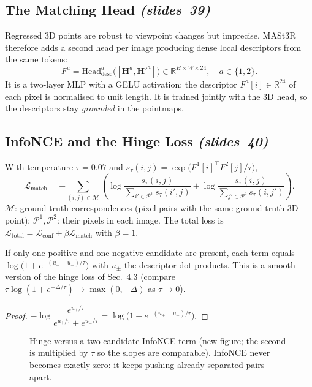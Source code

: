 \documentclass[11pt,a4paper]{article}
\newcommand{\slr}[1]{\texorpdfstring{\emph{(slides~#1)}}{(slides #1)}}
\theoremstyle{definition}
\begin{document}
\subsection{The Matching Head \slr{39}}
Regressed 3D points are robust to viewpoint changes but imprecise. MASt3R therefore adds a second head per image producing dense local descriptors from the same tokens:
\[ F^a=\mathrm{Head}^a_{\mathrm{desc}}\bigl([\bm H^a,\bm H'^a]\bigr)\in\mathbb R^{H\times W\times24},\quad a\in\{1,2\}. \]
It is a two-layer MLP with a GELU activation; the descriptor $F^a[i]\in\mathbb R^{24}$ of each pixel is normalised to unit length. It is trained jointly with the 3D head, so the descriptors stay \emph{grounded} in the pointmaps.

\subsection{InfoNCE and the Hinge Loss \slr{40}}
\begin{Definition}
With temperature $\tau=0.07$ and $s_\tau(i,j)=\exp\bigl(F^1[i]^{\top}F^2[j]/\tau\bigr)$,
\[
\mathcal L_{\mathrm{match}}=-\sum_{(i,j)\in\mathcal M}\left(\log\frac{s_\tau(i,j)}{\sum_{i'\in\mathcal P^1}s_\tau(i',j)}+\log\frac{s_\tau(i,j)}{\sum_{j'\in\mathcal P^2}s_\tau(i,j')}\right).
\]
$\mathcal M$: ground-truth correspondences (pixel pairs with the same ground-truth 3D point); $\mathcal P^1,\mathcal P^2$: their pixels in each image. The total loss is $\mathcal L_{\mathrm{total}}=\mathcal L_{\mathrm{conf}}+\beta\mathcal L_{\mathrm{match}}$ with $\beta=1$.
\end{Definition}
\begin{Proposition}
If only one positive and one negative candidate are present, each term equals $\log\bigl(1+e^{-(u_+-u_-)/\tau}\bigr)$ with $u_\pm$ the descriptor dot products. This is a smooth version of the hinge loss of Sec.~4.3 (compare $\tau\log(1+e^{-\Delta/\tau})\to\max(0,-\Delta)$ as $\tau\to0$).
\end{Proposition}
\begin{proof}
$-\log\dfrac{e^{u_+/\tau}}{e^{u_+/\tau}+e^{u_-/\tau}}=\log\bigl(1+e^{-(u_+-u_-)/\tau}\bigr)$.
\end{proof}
\begin{figure}[H]\centering
{}
\caption{Hinge versus a two-candidate InfoNCE term (new figure; the second is multiplied by $\tau$ so the slopes are comparable). InfoNCE never becomes exactly zero: it keeps pushing already-separated pairs apart.}
\end{figure}
\end{document}
